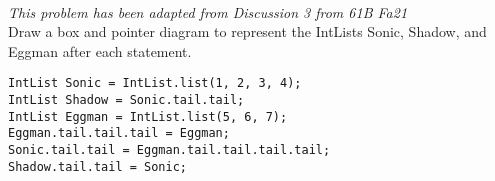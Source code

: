 \begin{blocksection}
\\
\textit{This problem has been adapted from Discussion 3 from 61B Fa21}\\
\question Draw a box and pointer diagram to represent the IntLists Sonic, Shadow, and Eggman after each statement.\\
\begin{lstlisting}
IntList Sonic = IntList.list(1, 2, 3, 4);
IntList Shadow = Sonic.tail.tail;
IntList Eggman = IntList.list(5, 6, 7);
Eggman.tail.tail.tail = Eggman;
Sonic.tail.tail = Eggman.tail.tail.tail.tail;
Shadow.tail.tail = Sonic;
\end{lstlisting}
\end{blocksection}
